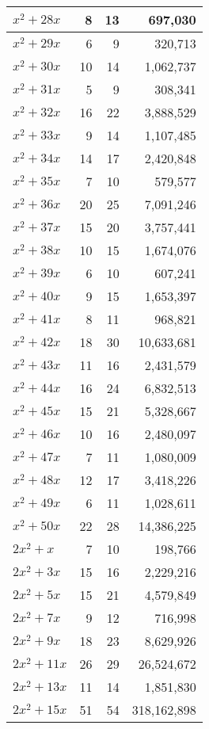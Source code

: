 \documentclass[a4paper]{amsproc}
\theoremstyle{plain}
\theoremstyle{named}
\begin{document}
\begin{longtable}{ | l | r | r | r | }
$x^2 + 28x$ & 8 & 13 & 697{,}030 \\ \hline
$x^2 + 29x$ & 6 & 9 & 320{,}713 \\ \hline
$x^2 + 30x$ & 10 & 14 & 1{,}062{,}737 \\ \hline
$x^2 + 31x$ & 5 & 9 & 308{,}341 \\ \hline
$x^2 + 32x$ & 16 & 22 & 3{,}888{,}529 \\ \hline
$x^2 + 33x$ & 9 & 14 & 1{,}107{,}485 \\ \hline
$x^2 + 34x$ & 14 & 17 & 2{,}420{,}848 \\ \hline
$x^2 + 35x$ & 7 & 10 & 579{,}577 \\ \hline
$x^2 + 36x$ & 20 & 25 & 7{,}091{,}246 \\ \hline
$x^2 + 37x$ & 15 & 20 & 3{,}757{,}441 \\ \hline
$x^2 + 38x$ & 10 & 15 & 1{,}674{,}076 \\ \hline
$x^2 + 39x$ & 6 & 10 & 607{,}241 \\ \hline
$x^2 + 40x$ & 9 & 15 & 1{,}653{,}397 \\ \hline
$x^2 + 41x$ & 8 & 11 & 968{,}821 \\ \hline
$x^2 + 42x$ & 18 & 30 & 10{,}633{,}681 \\ \hline
$x^2 + 43x$ & 11 & 16 & 2{,}431{,}579 \\ \hline
$x^2 + 44x$ & 16 & 24 & 6{,}832{,}513 \\ \hline
$x^2 + 45x$ & 15 & 21 & 5{,}328{,}667 \\ \hline
$x^2 + 46x$ & 10 & 16 & 2{,}480{,}097 \\ \hline
$x^2 + 47x$ & 7 & 11 & 1{,}080{,}009 \\ \hline
$x^2 + 48x$ & 12 & 17 & 3{,}418{,}226 \\ \hline
$x^2 + 49x$ & 6 & 11 & 1{,}028{,}611 \\ \hline
$x^2 + 50x$ & 22 & 28 & 14{,}386{,}225 \\ \hline
$2x^2 + x$ & 7 & 10 & 198{,}766 \\ \hline
$2x^2 + 3x$ & 15 & 16 & 2{,}229{,}216 \\ \hline
$2x^2 + 5x$ & 15 & 21 & 4{,}579{,}849 \\ \hline
$2x^2 + 7x$ & 9 & 12 & 716{,}998 \\ \hline
$2x^2 + 9x$ & 18 & 23 & 8{,}629{,}926 \\ \hline
$2x^2 + 11x$ & 26 & 29 & 26{,}524{,}672 \\ \hline
$2x^2 + 13x$ & 11 & 14 & 1{,}851{,}830 \\ \hline
$2x^2 + 15x$ & 51 & 54 & 318{,}162{,}898 \\ \hline

\end{longtable}
\end{document}
